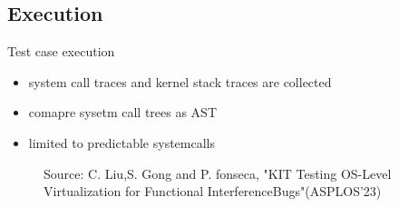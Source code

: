 \subsection{Execution}

\begin{frame}{Test case execution}{~}


\begin{minipage}{0.4 \textwidth}
    \begin{itemize}
    \setlength\itemsep{1em}
    \item system call traces and kernel stack traces are collected
    \item comapre sysetm call trees as AST
    \item limited to predictable systemcalls
\end{itemize}
\end{minipage}
\begin{minipage}{0.45\textwidth}
    \begin{figure}
        \center
    \def\stackalignment{l}
               {\scriptsize
                Source: C. Liu,S. Gong and P. fonseca, "KIT Testing }
                 {\scriptsize OS-Level Virtualization for Functional InterferenceBugs"(ASPLOS'23)}
    \end{figure}
\end{minipage}
\end{frame}